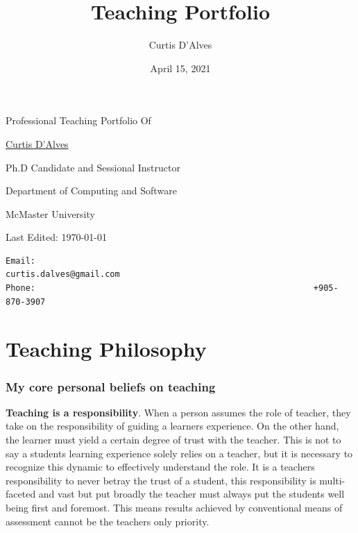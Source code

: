 \documentclass[12pt]{report}
\author{Curtis D'Alves}
\date{April 15, 2021}
\title{Teaching Portfolio}
\def\mytitle{??? Program Code ???}
\begin{document}
\def\labelitemi{$\diamond$}
\def\labelitemii{$\circ$}
\def\labelitemiii{$\star$}

%

\begin{center}


\thispagestyle{empty}

{\color{white}{.}}

\vspace{5em}

{\Huge Professional Teaching Portfolio Of}

\vspace{1em}

{\Large \href{mailto:curtis.dalves@gmail.com}{Curtis D'Alves}}

\vspace{2em}
Ph.D Candidate and Sessional Instructor

Department of Computing and Software

McMaster University

\vspace{2em}
Last Edited: \today

\vfill

\def\mytitle{{\sc Contact \hspace{12em} \color{grey}{.} }}
\begin{verbatim}
Email:                                                        curtis.dalves@gmail.com
Phone:                                                        +905-870-3907
\end{verbatim}
\end{center}

\thispagestyle{empty}
\tableofcontents
\newpage

\part{Teaching Philosophy}
\label{sec:orgbf2f24d}
\section{My core personal beliefs on teaching}
\label{sec:org3901377}

\textbf{Teaching is a responsibility}. When a person assumes the role of teacher,
they take on the responsibility of guiding a learners experience. On the other
hand, the learner must yield a certain degree of trust with the teacher. This
is not to say a students learning experience solely relies on a teacher, but
it is necessary to recognize this dynamic to effectively understand the role.
It is a teachers responsibility to never betray the trust of a student, this
responsibility is multi-faceted and vast but put broadly the teacher must
always put the students well being first and foremost. This means results
achieved by conventional means of assessment cannot be the teachers only
priority.
\end{document}
